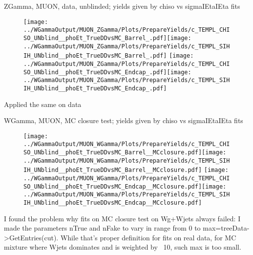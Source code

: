 \documentclass{beamer}
\begin{document}
\begin{frame}{ZGamma, MUON, data, unblinded; yields given by chiso vs sigmaIEtaIEta fits}
  \begin{figure}
    \centering
    \texttt{[image: ../WGammaOutput/MUON\_ZGamma/Plots/PrepareYields/c\_TEMPL\_CHISO\_UNblind\_\_phoEt\_TrueDDvsMC\_Barrel\_.pdf]}\texttt{[image: ../WGammaOutput/MUON\_ZGamma/Plots/PrepareYields/c\_TEMPL\_SIHIH\_UNblind\_\_phoEt\_TrueDDvsMC\_Barrel\_.pdf]}
    \texttt{[image: ../WGammaOutput/MUON\_ZGamma/Plots/PrepareYields/c\_TEMPL\_CHISO\_UNblind\_\_phoEt\_TrueDDvsMC\_Endcap\_.pdf]}\texttt{[image: ../WGammaOutput/MUON\_ZGamma/Plots/PrepareYields/c\_TEMPL\_SIHIH\_UNblind\_\_phoEt\_TrueDDvsMC\_Endcap\_.pdf]}
  \end{figure}
  \scriptsize Applied the same on data
\end{frame}

\begin{frame}{WGamma, MUON, MC closure test; yields given by chiso vs sigmaIEtaIEta fits}
  \begin{figure}
    \centering
    \texttt{[image: ../WGammaOutput/MUON\_WGamma/Plots/PrepareYields/c\_TEMPL\_CHISO\_UNblind\_\_phoEt\_TrueDDvsMC\_Barrel\_\_MCclosure.pdf]}\texttt{[image: ../WGammaOutput/MUON\_WGamma/Plots/PrepareYields/c\_TEMPL\_SIHIH\_UNblind\_\_phoEt\_TrueDDvsMC\_Barrel\_\_MCclosure.pdf]}
    \texttt{[image: ../WGammaOutput/MUON\_WGamma/Plots/PrepareYields/c\_TEMPL\_CHISO\_UNblind\_\_phoEt\_TrueDDvsMC\_Endcap\_\_MCclosure.pdf]}\texttt{[image: ../WGammaOutput/MUON\_WGamma/Plots/PrepareYields/c\_TEMPL\_SIHIH\_UNblind\_\_phoEt\_TrueDDvsMC\_Endcap\_\_MCclosure.pdf]}
  \end{figure}
  \scriptsize I found the problem why fits on MC closure test on Wg+Wjets always failed: I made the parameters nTrue and nFake to vary in range from 0 to max=treeData->GetEntries(cut). While that's proper definition for fits on real data, for MC mixture where Wjets dominates and is weighted by ~10, such max is too small.
\end{frame}

\end{document}
